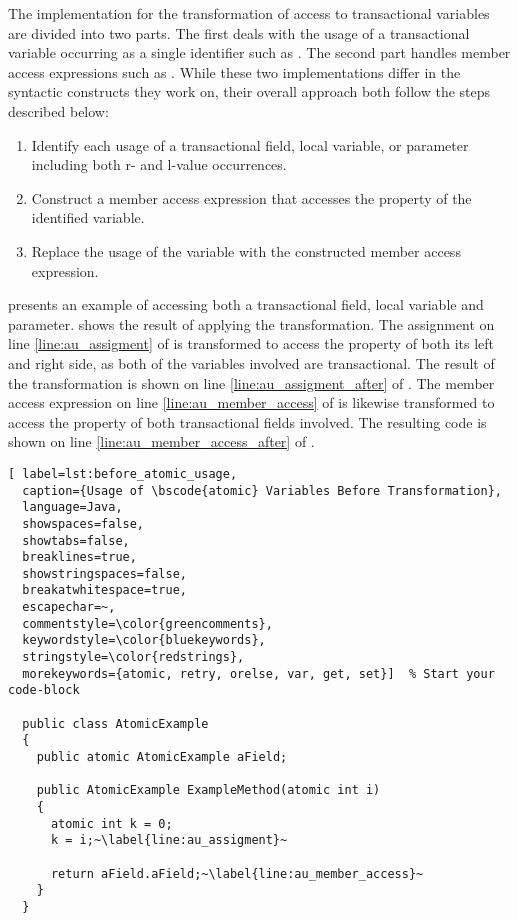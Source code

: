 The implementation for the transformation of access to transactional variables are divided into two parts. The first deals with the usage of a transactional variable occurring as a single identifier such as . The second part handles member access expressions such as . While these two implementations differ in the syntactic constructs they work on, their overall approach both follow the steps described below:

\begin{enumerate}
	\item Identify each usage of a transactional field, local variable, or parameter including both r- and l-value occurrences.
	\item Construct a member access expression that accesses the  property of the identified variable.
	\item Replace the usage of the variable with the constructed member access expression. 
\end{enumerate}

 presents an example of accessing both a transactional field, local variable and parameter.  shows the result of applying the transformation. The assignment on line \ref{line:au_assigment} of  is transformed to access the  property of both its left and right side, as both of the variables involved are transactional. The result of the transformation is shown on line \ref{line:au_assigment_after} of . The member access expression on line \ref{line:au_member_access} of  is likewise transformed to access the  property of both transactional fields involved. The resulting code is shown on line \ref{line:au_member_access_after} of .


\begin{lstlisting}[ label=lst:before_atomic_usage,
  caption={Usage of \bscode{atomic} Variables Before Transformation},
  language=Java,  
  showspaces=false,
  showtabs=false,
  breaklines=true,
  showstringspaces=false,
  breakatwhitespace=true,
  escapechar=~,
  commentstyle=\color{greencomments},
  keywordstyle=\color{bluekeywords},
  stringstyle=\color{redstrings},
  morekeywords={atomic, retry, orelse, var, get, set}]  % Start your code-block

  public class AtomicExample
  {
    public atomic AtomicExample aField;

    public AtomicExample ExampleMethod(atomic int i)
    {
      atomic int k = 0;
      k = i;~\label{line:au_assigment}~

      return aField.aField;~\label{line:au_member_access}~
    }
  }
\end{lstlisting}

